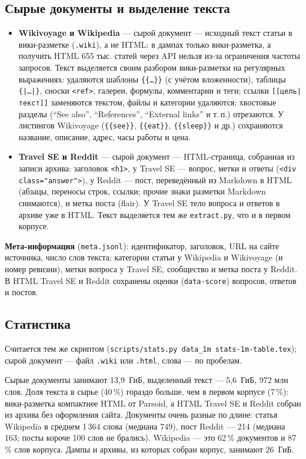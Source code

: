 \subsection{Сырые документы и выделение текста}
\begin{itemize}
    \item \textbf{Wikivoyage и Wikipedia} --- сырой документ --- исходный текст статьи в вики-разметке (\texttt{.wiki}), а не HTML: в дампах только вики-разметка, а получить HTML 655 тыс. статей через API нельзя из-за ограничения частоты запросов. Текст выделяется своим разбором вики-разметки на регулярных выражениях: удаляются шаблоны \texttt{\{\{\ldots\}\}} (с учётом вложенности), таблицы \texttt{\{|\ldots|\}}, сноски \texttt{<ref>}, галереи, формулы, комментарии и теги; ссылки \texttt{[[цель|текст]]} заменяются текстом, файлы и категории удаляются; хвостовые разделы (\enquote{See also}, \enquote{References}, \enquote{External links} и т.\,п.) отрезаются. У листингов Wikivoyage (\texttt{\{\{see\}\}}, \texttt{\{\{eat\}\}}, \texttt{\{\{sleep\}\}} и др.) сохраняются название, описание, адрес, часы работы и цена.
    \item \textbf{Travel SE и Reddit} --- сырой документ --- HTML-страница, собранная из записи архива: заголовок \texttt{<h1>}, у Travel SE --- вопрос, метки и ответы (\texttt{<div class="answer">}), у Reddit --- пост, переведённый из Markdown в HTML (абзацы, переносы строк, ссылки; прочие знаки разметки Markdown снимаются), и метка поста (flair). У Travel SE тело вопроса и ответов в архиве уже в HTML. Текст выделяется тем же \texttt{extract.py}, что и в первом корпусе.
\end{itemize}

\textbf{Мета-информация} (\texttt{meta.jsonl}): идентификатор, заголовок, URL на сайте источника, число слов текста; категории статьи у Wikipedia и Wikivoyage (и номер ревизии), метки вопроса у Travel SE, сообщество и метка поста у Reddit. В HTML Travel SE и Reddit сохранены оценки (\texttt{data-score}) вопросов, ответов и постов.

\subsection{Статистика}
Считается тем же скриптом (\texttt{scripts/stats.py data\_1m stats-1m-table.tex}); сырой документ --- файл \texttt{.wiki} или \texttt{.html}, слова --- по пробелам.
\begin{center}
\resizebox{\textwidth}{!}{}
\end{center}
Сырые документы занимают 13,9~ГиБ, выделенный текст --- 5,6~ГиБ, 972 млн слов. Доля текста в сырье (40\,\%) гораздо больше, чем в первом корпусе (7\,\%): вики-разметка компактнее HTML от Parsoid, а HTML Travel SE и Reddit собран из архива без оформления сайта. Документы очень разные по длине: статья Wikipedia в среднем 1\,364 слова (медиана 749), пост Reddit --- 214 (медиана 163; посты короче 100 слов не брались). Wikipedia --- это 62\,\% документов и 87\,\% слов корпуса. Дампы и архивы, из которых собран корпус, занимают 26~ГиБ.

